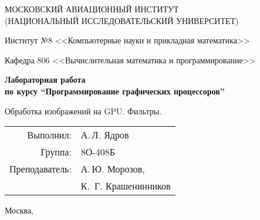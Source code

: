 \begin{titlepage}
\begin{center}
\large
МОСКОВСКИЙ АВИАЦИОННЫЙ ИНСТИТУТ\\ (НАЦИОНАЛЬНЫЙ ИССЛЕДОВАТЕЛЬСКИЙ УНИВЕРСИТЕТ)

\vspace{20pt}

Институт №8 <<Компьютерные науки и прикладная математика>>

Кафедра 806 <<Вычислительная математика и программирование>>
\end{center}

\vspace{60pt}

\begin{center}
\bfseries
\large
Лабораторная работа  \\по курсу \enquote{Программирование графических процессоров}

\vspace{54pt}

Обработка изображений на GPU. Фильтры.
\end{center}

\vfill

\begin{flushright}
\large
\begin{tabular}{rl}
Выполнил: & А.\,Л. Ядров \\
Группа: & 8О-408Б \\
Преподаватель: & А.\,Ю. Морозов, \\
& К.\, Г. Крашенинников
\end{tabular}
\end{flushright}

\vspace{92pt}

\begin{center}
\large
Москва, \the\year
\end{center}
\end{titlepage}

\pagebreak

